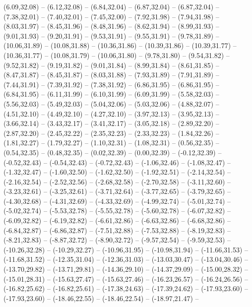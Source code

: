 {  (6.09,32.08) -- (6.12,32.08) -- (6.84,32.04) -- (6.87,32.04) -- (6.87,32.04) -- (7.38,32.01) -- (7.40,32.01) --
  (7.45,32.00) -- (7.92,31.98) -- (7.94,31.98) -- (8.03,31.97) -- (8.45,31.96) -- (8.48,31.96) -- (8.62,31.94) --
  (8.99,31.93) -- (9.01,31.93) -- (9.20,31.91) -- (9.53,31.91) -- (9.55,31.91) -- (9.78,31.89) -- (10.06,31.89) --
  (10.08,31.88) -- (10.36,31.86) -- (10.39,31.86) -- (10.39,31.77) -- (10.36,31.77) -- (10.08,31.79) -- (10.06,31.80) --
  (9.78,31.80) -- (9.54,31.82) -- (9.52,31.82) -- (9.19,31.82) -- (9.01,31.84) -- (8.99,31.84) -- (8.61,31.85) --
  (8.47,31.87) -- (8.45,31.87) -- (8.03,31.88) -- (7.93,31.89) -- (7.91,31.89) -- (7.44,31.91) -- (7.39,31.92) --
  (7.38,31.92) -- (6.86,31.95) -- (6.86,31.95) -- (6.84,31.95) -- (6.11,31.99) -- (6.10,31.99) -- (6.09,31.99) --
  (5.58,32.03) -- (5.56,32.03) -- (5.49,32.03) -- (5.04,32.06) -- (5.03,32.06) -- (4.88,32.07) -- (4.51,32.10) --
  (4.49,32.10) -- (4.27,32.10) -- (3.97,32.13) -- (3.95,32.13) -- (3.66,32.14) -- (3.43,32.17) -- (3.41,32.17) --
  (3.05,32.18) -- (2.89,32.20) -- (2.87,32.20) -- (2.45,32.22) -- (2.35,32.23) -- (2.33,32.23) -- (1.84,32.26) --
  (1.81,32.27) -- (1.79,32.27) -- (1.10,32.31) -- (1.08,32.31) -- (0.56,32.35) -- (0.54,32.35) -- (0.48,32.35) --
  (0.02,32.39) -- (0.00,32.39) -- (-0.12,32.39) -- (-0.52,32.43) -- (-0.54,32.43) -- (-0.72,32.43) -- (-1.06,32.46) --
  (-1.08,32.47) -- (-1.32,32.47) -- (-1.60,32.50) -- (-1.62,32.50) -- (-1.92,32.51) -- (-2.14,32.54) -- (-2.16,32.54) --
  (-2.52,32.56) -- (-2.68,32.58) -- (-2.70,32.58) -- (-3.11,32.60) -- (-3.23,32.61) -- (-3.25,32.61) -- (-3.71,32.64) --
  (-3.77,32.65) -- (-3.79,32.65) -- (-4.30,32.68) -- (-4.31,32.69) -- (-4.33,32.69) -- (-4.99,32.74) -- (-5.01,32.74) --
  (-5.02,32.74) -- (-5.53,32.78) -- (-5.55,32.78) -- (-5.60,32.78) -- (-6.07,32.82) -- (-6.09,32.82) -- (-6.19,32.82) --
  (-6.61,32.86) -- (-6.63,32.86) -- (-6.68,32.86) -- (-6.84,32.87) -- (-6.86,32.87) -- (-7.51,32.88) -- (-7.53,32.88) --
  (-8.19,32.83) -- (-8.21,32.83) -- (-8.87,32.72) -- (-8.90,32.72) -- (-9.57,32.54) -- (-9.59,32.53) -- (-10.26,32.28) --
  (-10.29,32.27) -- (-10.96,31.95) -- (-10.98,31.94) -- (-11.66,31.53) -- (-11.68,31.52) -- (-12.35,31.04) -- (-12.36,31.03) --
  (-13.03,30.47) -- (-13.04,30.46) -- (-13.70,29.82) -- (-13.71,29.81) -- (-14.36,29.10) -- (-14.37,29.09) -- (-15.00,28.32) --
  (-15.01,28.31) -- (-15.63,27.47) -- (-15.63,27.46) -- (-16.23,26.57) -- (-16.24,26.56) -- (-16.82,25.62) -- (-16.82,25.61) --
  (-17.38,24.63) -- (-17.39,24.62) -- (-17.93,23.60) -- (-17.93,23.60) -- (-18.46,22.55) -- (-18.46,22.54) -- (-18.97,21.47) --
}
